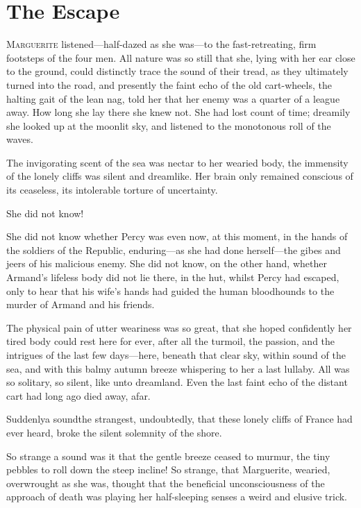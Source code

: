 
\chapter{The Escape}
\lettrine[lines=4]{M}{arguerite} listened—half-dazed as she was—to the fast-retreating, firm footsteps of the four men. All nature was so still that she, lying with her ear close to the ground, could distinctly trace the sound of their tread, as they ultimately turned into the road, and presently the faint echo of the old cart-wheels, the halting gait of the lean nag, told her that her enemy was a quarter of a league away. How long she lay there she knew not. She had lost count of time; dreamily she looked up at the moonlit sky, and listened to the monotonous roll of the waves.

The invigorating scent of the sea was nectar to her wearied body, the immensity of the lonely cliffs was silent and dreamlike. Her brain only remained conscious of its ceaseless, its intolerable torture of uncertainty.

She did not know!\longdash


She did not know whether Percy was even now, at this moment, in the hands of the soldiers of the Republic, enduring—as she had done herself—the gibes and jeers of his malicious enemy. She did not know, on the other hand, whether Armand's lifeless body did not lie there, in the hut, whilst Percy had escaped, only to hear that his wife's hands had guided the human bloodhounds to the murder of Armand and his friends.

The physical pain of utter weariness was so great, that she hoped confidently her tired body could rest here for ever, after all the turmoil, the passion, and the intrigues of the last few days—here, beneath that clear sky, within sound of the sea, and with this balmy autumn breeze whispering to her a last lullaby. All was so solitary, so silent, like unto dreamland. Even the last faint echo of the distant cart had long ago died away, afar.

Suddenly\textellipsis \allowbreak  a sound\textellipsis \allowbreak  the strangest, undoubtedly, that these lonely cliffs of France had ever heard, broke the silent solemnity of the shore.

So strange a sound was it that the gentle breeze ceased to murmur, the tiny pebbles to roll down the steep incline! So strange, that Marguerite, wearied, overwrought as she was, thought that the beneficial unconsciousness of the approach of death was playing her half-sleeping senses a weird and elusive trick.

